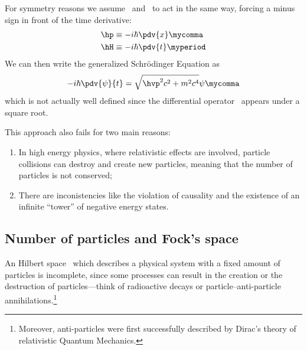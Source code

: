         For symmetry reasons we assume \hp\ and \htt\ to act in the same way, forcing a minus sign in front of the time derivative:
        \begin{align}
            \hp &\equiv -i\hbar \pdv{x}
            \mycomma\\
            \hH &\equiv -i\hbar \pdv{t}
            \myperiod
        \end{align}
        We can then write the generalized Schr\"odinger Equation as
        \begin{equation}
            -i \hbar \pdv{\psi}{t} = \sqrt{\hvp^2 c^2 + m^2 c^4}\psi
            \mycomma
        \end{equation}
        which is not actually well defined since the differential operator \hvp\ appears under a square root.

        This approach also fails for two main reasons:
        \begin{enumerate}
            \item In high energy physics, where relativistic effects are involved, particle collisions can destroy and create new particles, meaning that the number of particles is not conserved;
            \item There are inconistencies like the violation of causality and the existence of an infinite ``tower'' of negative energy states.
        \end{enumerate}
        
        \subsection{Number of particles and Fock's space}
            An Hilbert space \msH\ which describes a physical system with a fixed amount of particles is incomplete, since some processes can result in the creation or the destruction of particles---think of radioactive decays or particle--anti-particle annihilations.\footnote{Moreover, anti-particles were first successfully described by Dirac's theory of relativistic Quantum Mechanics.} 

